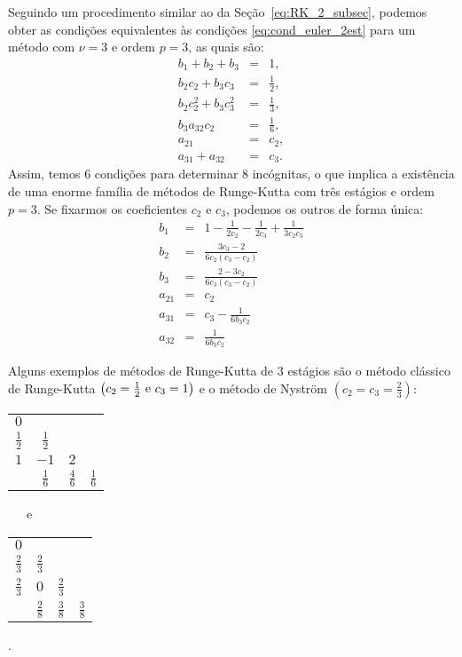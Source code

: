 Seguindo um procedimento similar ao da Seção~\ref{eq:RK_2_subsec}, podemos obter as condições equivalentes às condições \eqref{eq:cond_euler_2est} para um método com $\nu =3$ e ordem $p=3$, as quais são:
\begin{eqnarray}\label{eq:cond_euler_3est}
  b_1+b_2+b_3		&=& 1,            		\label{eq:cond_euler_3est:1} \\
  b_2c_2+b_3c_3 	&=& \frac{1}{2},	 	\label{eq:cond_euler_3est:2} \\
  b_2c_2^2+b_3c_3^2	&=& \frac{1}{3}, 		\label{eq:cond_euler_3est:3} \\
  b_3a_{32}c_2		&=& \frac{1}{6},		\label{eq:cond_euler_3est:4} \\
  a_{21}		&=& c_2,			\label{eq:cond_euler_3est:5} \\
  a_{31}+a_{32}		&=& c_3.			\label{eq:cond_euler_3est:6}
\end{eqnarray}
Assim, temos 6 condições para determinar 8 incógnitas, o que implica a existência de uma enorme família de métodos de Runge-Kutta com três estágios e ordem $p=3$. Se fixarmos os coeficientes $c_2$ e $c_3$, podemos os outros de forma única:
\begin{eqnarray}
 b_1&=&1-\frac{1}{2c_2}-\frac{1}{2c_3}+\frac{1}{3c_2c_3}\\
 b_2&=&\frac{3c_3-2}{6c_2(c_3-c_2)}\\
 b_3&=&\frac{2-3c_2}{6c_3(c_3-c_2)}\\
 a_{21}&=&c_2\\
 a_{31}&=&c_3-\frac{1}{6b_3c_2}\\
 a_{32}&=&\frac{1}{6b_3c_2}
\end{eqnarray}


 Alguns exemplos de métodos de Runge-Kutta de 3 estágios são o método clássico de Runge-Kutta $\left(c_2=\frac{1}{2}\hbox{ e } c_3=1\right)$ e o método de Nyström $\left(c_2=c_3=\frac{2}{3}\right)$:
\begin{center}
\begin{tabular}{c|ccc}
  $0$           &               &               & \\
  $\frac{1}{2}$ & $\frac{1}{2}$ &               & \\
  $1$           & $-1$          & $2$           & \\  \hline
                & $\frac{1}{6}$ & $\frac{4}{6}$ & $\frac{1}{6}$
\end{tabular}
~~~e~~~~~~\begin{tabular}{c|ccc}
  $0$ &     &   & \\
  $\frac{2}{3}$ & $\frac{2}{3}$ &   & \\
  $\frac{2}{3}$ & $0$ &$\frac{2}{3}$& \\  \hline
      & $\frac{2}{8}$ &$\frac{3}{8}$& $\frac{3}{8}$
\end{tabular}.
\end{center}

